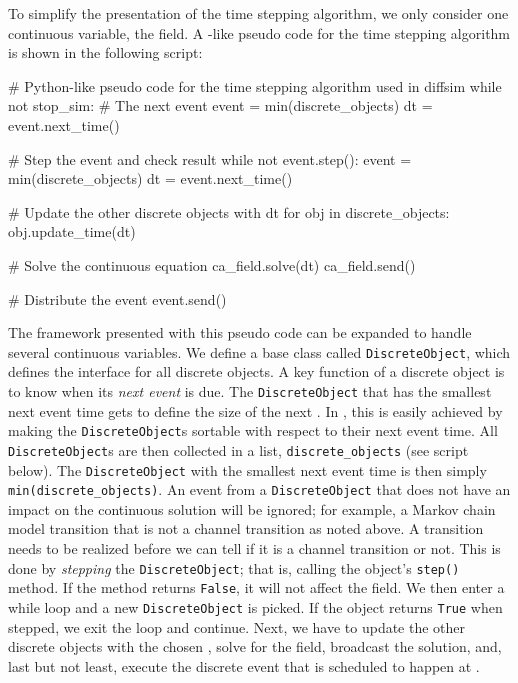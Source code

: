 \label{sec:hake:event-driven-simulator}
To simplify the presentation of the time stepping algorithm, we only
consider one continuous variable, the \Ca field. A
-like pseudo code for the time stepping algorithm
is shown in the following script:
\begin{python}
# Python-like pseudo code for the time stepping algorithm used in diffsim
while not stop_sim:
    # The next event
    event = min(discrete_objects)
    dt = event.next_time()

    # Step the event and check result
    while not event.step():
        event = min(discrete_objects)
        dt = event.next_time()

    # Update the other discrete objects with dt
    for obj in discrete_objects:
        obj.update_time(dt)

    # Solve the continuous equation
    ca_field.solve(dt)
    ca_field.send()

    # Distribute the event
    event.send()
\end{python}
The framework presented with this pseudo code can be expanded to
handle several continuous variables. We define a base class called
\texttt{DiscreteObject}, which defines the interface for all discrete
objects. A key function of a discrete object is to know when its
\textit{next event} is due. The \texttt{DiscreteObject} that has the
smallest next event time gets to define the size of the next \Dt. In
, this is easily achieved by making the
\texttt{DiscreteObject}s sortable with respect to their next event
time. All \texttt{DiscreteObject}s are then collected in a list,
\texttt{discrete\_objects} (see script below). The
\texttt{DiscreteObject} with the smallest next event time is then
simply \texttt{min(discrete\_objects)}. An event from a
\texttt{DiscreteObject} that does not have an impact on the continuous
solution will be ignored; for example, a Markov chain model transition
that is not a channel transition as noted above. A transition needs to
be realized before we can tell if it is a channel transition or
not. This is done by \textit{stepping} the \texttt{DiscreteObject};
that is, calling the object's \texttt{step()} method. If the method
returns \texttt{False}, it will not affect the \Ca field. We then enter
a while loop and a new \texttt{DiscreteObject} is picked. If the
object returns \texttt{True} when stepped, we exit the loop and
continue. Next, we have to update the other discrete objects with the
chosen \Dt, solve for the \Ca field, broadcast the solution, and, last
but not least, execute the discrete event that is scheduled to happen
at \Dt.

